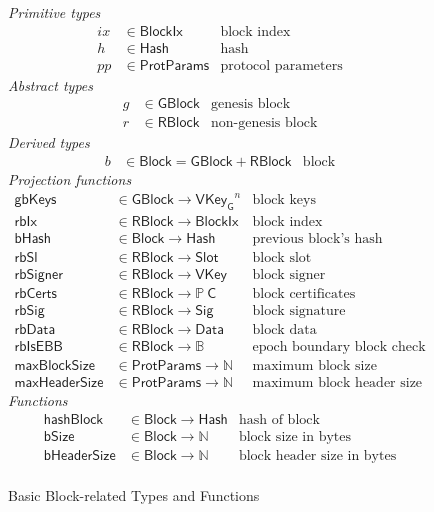 \documentclass[11pt,a4paper]{article}
\newcommand{\powerset}[1]{\mathbb{P}~#1}
\newcommand{\fun}[1]{\mathsf{#1}}
\newcommand{\type}[1]{\mathsf{#1}}
\newcommand{\Hash}{\type{Hash}}  %
\newcommand{\Slot}{\type{Slot}}
\newcommand{\BlockIx}{\type{BlockIx}}
\newcommand{\GBlock}{\type{GBlock}}
\newcommand{\RBlock}{\type{RBlock}}
\newcommand{\Block}{\type{Block}}
\newcommand{\HCert}{\type{C}}
\newcommand{\VKey}{\type{VKey}}
\newcommand{\VKeyGen}{\type{VKey_G}}
\newcommand{\Sig}{\type{Sig}}
\newcommand{\Data}{\type{Data}}
\newcommand{\ProtParams}{\type{ProtParams}} %
\newcommand{\hashname}{bHash}
\newcommand{\bsizename}{bSize}
\newcommand{\bhdrsizename}{bHeaderSize}
\newcommand{\hashofblockname}{hashBlock}
\newcommand{\maxblocksizename}{maxBlockSize}
\newcommand{\maxheadersizename}{maxHeaderSize}
\newcommand{\isebbname}{rbIsEBB}
\newcommand{\rbdataname}{rbData}
\newcommand{\rbcertsname}{rbCerts}
\newcommand{\rbsigname}{rbSig}
\newcommand{\rbixname}{rbIx}
\newcommand{\rbslname}{rbSl}
\newcommand{\rbsignername}{rbSigner}
\newcommand{\totalf}{\to}
\begin{document}
\begin{figure}
  \emph{Primitive types}
  \begin{align*}
    ix & \in \BlockIx & \text{block index}\\
    h  & \in \Hash   & \text{hash}\\
    pp & \in \ProtParams & \text{protocol parameters}
  \end{align*}
  \emph{Abstract types}
  \begin{align*}
    g & \in \GBlock & \text{genesis block} \\
    r & \in \RBlock & \text{non-genesis block}
  \end{align*}
  \emph{Derived types}
  \begin{align*}
    b & \in \Block = \GBlock + \RBlock & \text{block}
  \end{align*}
  \emph{Projection functions}
  \begin{align*}
    \fun{gbKeys} & \in \GBlock \totalf \VKeyGen^n & \text{block keys} \\
    \fun{\rbixname} & \in \RBlock \totalf \BlockIx & \text{block index} \\
    \fun{\hashname} & \in \Block \totalf \Hash
      & \text{previous block's hash} \\
    \fun{\rbslname} & \in \RBlock \totalf \Slot & \text{block slot} \\
    \fun{\rbsignername} & \in \RBlock \totalf \VKey & \text{block signer} \\
    \fun{\rbcertsname} & \in \RBlock \totalf \powerset{\HCert}
      & \text{block certificates} \\
    \fun{\rbsigname} & \in \RBlock \totalf \Sig & \text{block signature} \\
    \fun{\rbdataname} & \in \RBlock \totalf \Data & \text{block data} \\
    \fun{\isebbname} & \in \RBlock \totalf \mathbb{B} & \text{epoch boundary block check}\\
    \fun{\maxblocksizename} & \in \ProtParams \totalf \mathbb{N} & \text{maximum block size} \\
    \fun{\maxheadersizename} & \in \ProtParams \totalf \mathbb{N}
      & \text{maximum block header size}
  \end{align*}
  \emph{Functions}
  \begin{align*}
    \fun{\hashofblockname} & \in \Block \totalf \Hash & \text{hash of block} \\
    \fun{\bsizename} & \in \Block \totalf \mathbb{N} & \text{block size in bytes} \\
    \fun{\bhdrsizename} & \in \Block \totalf \mathbb{N}
      & \text{block header size in bytes}\\
  \end{align*}
  \caption{Basic Block-related Types and Functions}
  \label{fig:block-defs}
\end{figure}
\end{document}

